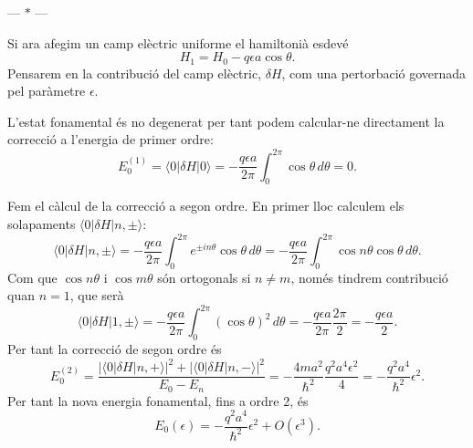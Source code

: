 \documentclass[12pt]{article}
\numberwithin{table}{section}
\numberwithin{figure}{section}
\numberwithin{equation}{section}
\newcommand{\abs}[1]{\lvert #1 \rvert}
\newcommand{\ket}[1]{\vert {#1} \rangle}
\newcommand{\bra}[1]{\langle #1 \vert}
\newcommand{\parbreak}{
	\begin{center}
		--- $\ast$ ---
	\end{center} 
}
\begin{document}
\parbreak

Si ara afegim un camp elèctric uniforme el hamiltonià esdevé
\begin{equation*}
	H_1 = H_0 - q\epsilon a \cos{\theta}.
\end{equation*}
Pensarem en la contribució del camp elèctric, \( \delta H \), com una pertorbació governada pel paràmetre \( \epsilon \).

L'estat fonamental és no degenerat per tant podem calcular-ne directament la correcció a l'energia de primer ordre:
\begin{equation*}
	E_0^{(1)} = \bra{0}\delta H \ket{0} = -\frac{q\epsilon a}{2\pi} \int_0^{2\pi} \cos{\theta} \, d\theta	= 0.
\end{equation*}

Fem el càlcul de la correcció a segon ordre. En primer lloc calculem els solapaments \( \bra{0}\delta H \ket{n, \pm} \):
\begin{equation*}
	\bra{0}\delta H\ket{n,\pm} = -\frac{q\epsilon a}{2\pi} \int_0^{2\pi} e^{\pm in\theta} \cos{\theta} \,d\theta = - \frac{q\epsilon a}{2\pi} \int_0^{2\pi} \cos{n\theta} \cos{\theta} \,d\theta.
\end{equation*}
Com que \( \cos{n\theta} \) i \( \cos{m\theta} \) són ortogonals si \( n \neq m \), només tindrem contribució quan \( n = 1 \), que serà
\begin{equation*}
	\bra{0}\delta H\ket{1,\pm} = - \frac{q\epsilon a}{2\pi} \int_0^{2\pi} (\cos{\theta})^2 \,d\theta = - \frac{q\epsilon a}{2\pi}\frac{2\pi}{2} = - \frac{q \epsilon a}{2}.
\end{equation*}
Per tant la correcció de segon ordre és
\begin{equation*}
	E_0^{(2)} = \frac{\abs{\bra{0}\delta H \ket{n, +}}^2 + \abs{\bra{0}\delta H \ket{n, -}}^2}{E_0 - E_n} = -\frac{4ma^2}{\hbar^2} \frac{q^2a^4\epsilon^2}{4} = - \frac{q^2a^4}{\hbar^2}\epsilon^2.
\end{equation*}
Per tant la nova energia fonamental, fins a ordre 2, és
\begin{equation*}
	E_0(\epsilon) = -\frac{q^2a^4}{\hbar^2}\epsilon^2 + O(\epsilon^3).
\end{equation*}
\end{document}
